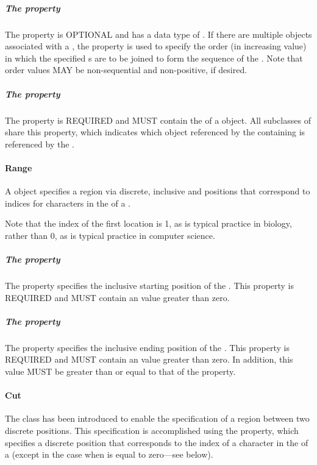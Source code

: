 \subparagraph{The  property}
\label{sec:order}
The  property is OPTIONAL and has a data type of .  If there are multiple  objects associated with a , the  property is used to specify the order (in increasing value) in which the specified s are to be joined to form the sequence of the .
Note that order values MAY be non-sequential and non-positive, if desired.

\subparagraph{The  property}
\label{sec:hasSequence:L}
The  property is REQUIRED and MUST contain the  of a  object. All subclasses of  share this property, which indicates which  object referenced by the containing  is referenced by the .

\paragraph{Range}
\label{sec:Range}
A  object specifies a region via discrete, inclusive  and  positions that correspond to indices for characters in the   of a .

Note that the index of the first location is 1, as is typical practice in biology, rather than 0, as is typical practice in computer science.

\subparagraph{The  property}\label{sec:start}
The  property specifies the inclusive starting position of the . This property is REQUIRED and MUST contain an  value greater than zero.

\subparagraph{The  property}\label{sec:end}
The  property specifies the inclusive ending position of the . This property is REQUIRED and MUST contain an  value greater than zero. In addition, this  value MUST be greater than or equal to that of the  property.

\paragraph{Cut}
\label{sec:Cut}
The  class has been introduced to enable the specification of a region between two discrete positions.
This specification is accomplished using the  property, which specifies a discrete position that corresponds to the index of a character in the   of a  (except in the case when  is equal to zero---see below).

